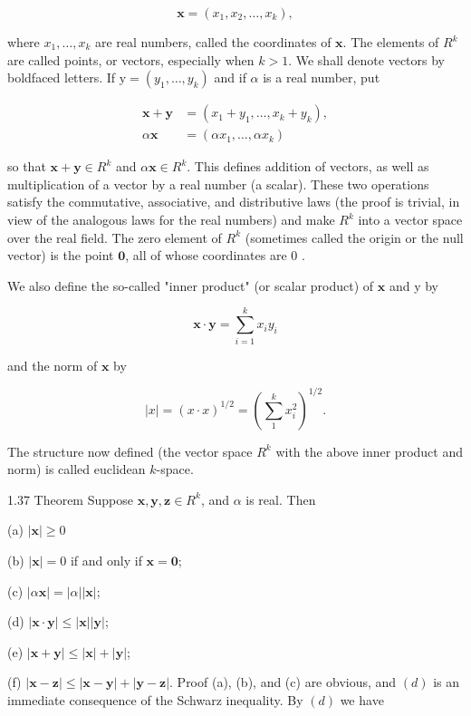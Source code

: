 \documentclass[10pt]{article}
\begin{document}
$$
\mathbf{x}=\left(x_{1}, x_{2}, \ldots, x_{k}\right),
$$

where $x_{1}, \ldots, x_{k}$ are real numbers, called the coordinates of $\mathbf{x}$. The elements of $R^{k}$ are called points, or vectors, especially when $k>1$. We shall denote vectors by boldfaced letters. If $\mathrm{y}=\left(y_{1}, \ldots, y_{k}\right)$ and if $\alpha$ is a real number, put

$$
\begin{aligned}
\mathbf{x}+\mathbf{y} & =\left(x_{1}+y_{1}, \ldots, x_{k}+y_{k}\right), \\
\alpha \mathbf{x} & =\left(\alpha x_{1}, \ldots, \alpha x_{k}\right)
\end{aligned}
$$

so that $\mathbf{x}+\mathbf{y} \in R^{k}$ and $\alpha \mathbf{x} \in R^{k}$. This defines addition of vectors, as well as multiplication of a vector by a real number (a scalar). These two operations satisfy the commutative, associative, and distributive laws (the proof is trivial, in view of the analogous laws for the real numbers) and make $R^{k}$ into a vector space over the real field. The zero element of $R^{k}$ (sometimes called the origin or the null vector) is the point $\mathbf{0}$, all of whose coordinates are 0 .

We also define the so-called "inner product" (or scalar product) of $\mathbf{x}$ and y by

$$
\mathbf{x} \cdot \mathbf{y}=\sum_{i=1}^{k} x_{i} y_{i}
$$

and the norm of $\mathbf{x}$ by

$$
|x|=(x \cdot x)^{1 / 2}=\left(\sum_{1}^{k} x_{i}^{2}\right)^{1 / 2} .
$$

The structure now defined (the vector space $R^{k}$ with the above inner product and norm) is called euclidean $k$-space.

1.37 Theorem Suppose $\mathbf{x}, \mathbf{y}, \mathbf{z} \in R^{k}$, and $\alpha$ is real. Then

(a) $|\mathbf{x}| \geq 0$

(b) $|\mathbf{x}|=0$ if and only if $\mathbf{x}=\mathbf{0}$;

(c) $|\alpha \mathbf{x}|=|\alpha||\mathbf{x}|$;

(d) $|\mathbf{x} \cdot \mathbf{y}| \leq|\mathbf{x}||\mathbf{y}|$;

(e) $|\mathbf{x}+\mathbf{y}| \leq|\mathbf{x}|+|\mathbf{y}|$;

(f) $|\mathbf{x}-\mathbf{z}| \leq|\mathbf{x}-\mathbf{y}|+|\mathbf{y}-\mathbf{z}|$. Proof (a), (b), and (c) are obvious, and $(d)$ is an immediate consequence of the Schwarz inequality. By $(d)$ we have
\end{document}
